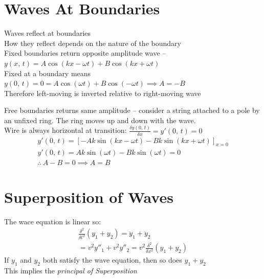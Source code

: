 \documentclass[a4paper, 11pt, fleqn, normalem]{report}
\begin{document}
\section{Waves At Boundaries}
Waves reflect at boundaries \\
How they reflect depends on the nature of the boundary \\
Fixed boundaries return opposite amplitude wave -- $y(x,\,t) = A\cos{(kx - \omega t)} + B\cos{(kx + \omega t)}$ \\
Fixed at a boundary means $y(0,\,t) = 0 = A\cos{(\omega t)} + B\cos{(-\omega t)} \implies A = -B$ \\
Therefore left-moving is inverted relative to right-moving wave

Free boundaries returns same amplitude -- consider a string attached to a pole by an unfixed ring.
The ring moves up and down with the wave. \\
Wire is always horizontal at transition: $\frac{\delta y(0,\,t)}{\delta x} = y'(0,\,t) = 0$
\begin{gather*}
    y'(0,\,t) = [-Ak\sin{(kx - \omega t)} - Bk\sin{(kx + \omega t)}]_{x = 0} \\
    y'(0,\,t) = Ak\sin{(\omega t)} - Bk\sin{(\omega t)} = 0 \\
    \therefore~ A - B = 0 \implies A = B
\end{gather*}

\section{Superposition of Waves}
The wace equation is linear so:
\begin{gather*}
    \frac{\delta^{2}}{\delta t^{2}}(y_{1} + y_{2}) = \ddot{y}_{1} + \ddot{y}_{2} \\
    = v^{2}y''_{1} + v^{2}y''_{2} = v^{2}\frac{\delta^{2}}{\delta x^{2}}(y_{1} + y_{2})
\end{gather*}
If $y_{1}$ and $y_{2}$ both satisfy the wave equation, then so does $y_{1} + y_{2}$ \\
This implies the \emph{principal of Superposition}
\end{document}
